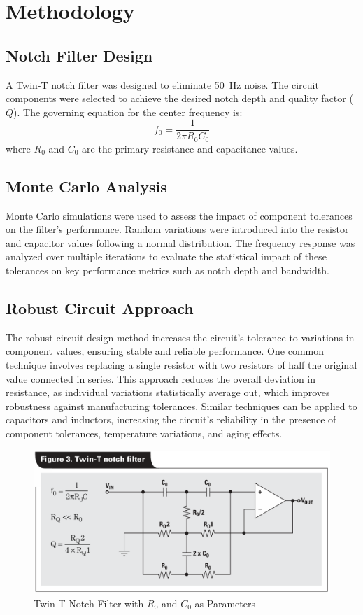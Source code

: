 \documentclass[hidelinks,12pt]{article}
\begin{document}
	
	\section{Methodology}
	\subsection{Notch Filter Design}
	A Twin-T notch filter was designed to eliminate 50~Hz noise. The circuit components were selected to achieve the desired notch depth and quality factor ($Q$). The governing equation for the center frequency is:
	\begin{equation} \label{eq:1}
		f_0 = \frac{1}{2\pi R_0 C_0}
	\end{equation}
	where $R_0$ and $C_0$ are the primary resistance and capacitance values.
	
	\subsection{Monte Carlo Analysis}
	Monte Carlo simulations were used to assess the impact of component tolerances on the filter's performance. Random variations were introduced into the resistor and capacitor values following a normal distribution. The frequency response was analyzed over multiple iterations to evaluate the statistical impact of these tolerances on key performance metrics such as notch depth and bandwidth.
		
	\subsection{Robust Circuit Approach} \label{robust}
	The robust circuit design method increases the circuit's tolerance to variations in component values, ensuring stable and reliable performance. One common technique involves replacing a single resistor with two resistors of half the original value connected in series. This approach reduces the overall deviation in resistance, as individual variations statistically average out, which improves robustness against manufacturing tolerances. Similar techniques can be applied to capacitors and inductors, increasing the circuit's reliability in the presence of component tolerances, temperature variations, and aging effects.
	
	
	\begin{figure}[!h]
		\centering
		\includegraphics[scale=0.3]{figures/Twin_T.png}
		\caption{Twin-T Notch Filter with \( R_0 \) and \( C_0 \) as Parameters}
	\end{figure}
\end{document}
